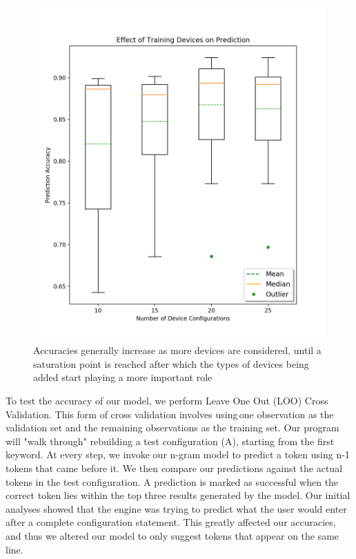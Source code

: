 \begin{figure}
	\centering
	\includegraphics[width=\columnwidth]{umn_analysis.png}
	\caption{Accuracies generally increase as more devices are considered, until a saturation point is reached after which the types of devices being added start playing a more important role}
    \label{fig:umn_analysis}
\end{figure}

To test the accuracy of our model, we perform Leave One Out (LOO) Cross Validation. This form of cross validation involves using one observation as the validation set and the remaining observations as the training set. Our program will "walk through" rebuilding a test configuration (A), starting from the first keyword. At every step, we invoke our n-gram model to predict a token using n-1 tokens that came before it. We then compare our predictions against the actual tokens in the test configuration. A prediction is marked as successful when the correct token lies within the top three results generated by the model. Our initial analyses showed that the engine was trying to predict what the user would enter after a complete configuration statement. This greatly affected our accuracies, and thus we altered our model to only suggest tokens that appear on the same line.\\

